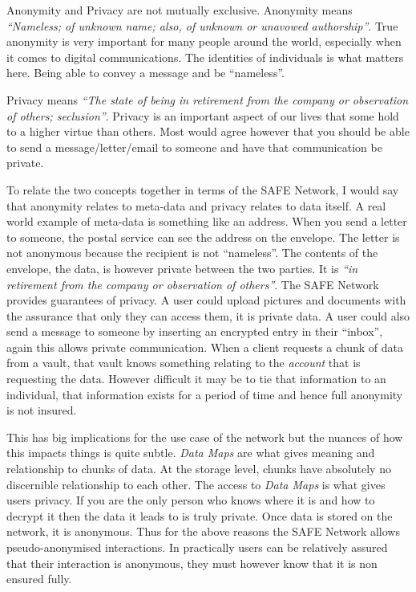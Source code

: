 Anonymity and Privacy are not mutually exclusive. Anonymity means \textit{``Nameless; of unknown name; also, of unknown or unavowed authorship''}\cite{anonymous}. True anonymity is very important for many people around the world, especially when it comes to digital communications. The identities of individuals is what matters here. Being able to convey a message and be ``nameless''. 

Privacy means \textit{``The state of being in retirement from the company or observation of others; seclusion''}\cite{privacy}. Privacy is an important aspect of our lives that some hold to a higher virtue than others. Most would agree however that you should be able to send a message/letter/email to someone and have that communication be private.

To relate the two concepts together in terms of the SAFE Network, I would say that anonymity relates to meta-data and privacy relates to data itself. A real world example of meta-data is something like an address. When you send a letter to someone, the postal service can see the address on the envelope. The letter is not anonymous because the recipient is not ``nameless''. The contents of the envelope, the data, is however private between the two parties. It is \textit{``in retirement from the company or observation of others''}. The SAFE Network provides guarantees of privacy. A user could upload pictures and documents with the assurance that only they can access them, it is private data. A user could also send a message to someone by inserting an encrypted entry in their ``inbox'', again this allows private communication. When a client requests a chunk of data from a vault, that vault knows something relating to the \textit{account} that is requesting the data. However difficult it may be to tie that information to an individual, that information exists for a period of time and hence full anonymity is not insured.

This has big implications for the use case of the network but the nuances of how this impacts things is quite subtle. \textit{Data Maps} are what gives meaning and relationship to chunks of data. At the storage level, chunks have absolutely no discernible relationship to each other. The access to \textit{Data Maps} is what gives users privacy. If you are the only person who knows where it is and how to decrypt it then the data it leads to is truly private. Once data is stored on the network, it is anonymous. Thus for the above reasons the SAFE Network allows pseudo-anonymised interactions. In practically users can be relatively assured that their interaction is anonymous, they must however know that it is non ensured fully.

